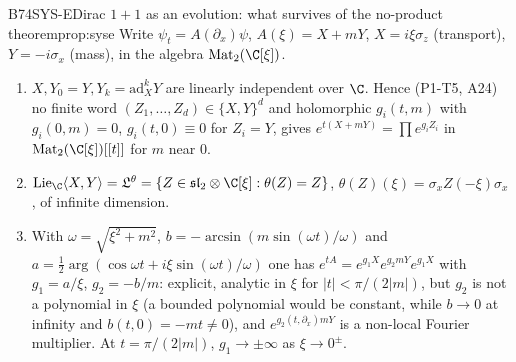 \begin{dimcard}{B74}{SYS-E}{Dirac $1+1$ as an evolution: what survives of the no-product theorem}{\proved}{prop:syse}
Write $\psi_t=A(\partial_x)\psi$, $A(\xi)=X+mY$, $X=i\xi\sigma_z$ (transport), $Y=-i\sigma_x$ (mass), in the algebra $\mathrm{Mat}_2(\C[\xi])$.
\begin{enumerate}[label=(E\arabic*)]
\item $X,Y_0=Y,Y_k=\mathrm{ad}_X^kY$ are linearly independent over $\C$. Hence (P1-T5, A24) no finite word $(Z_1,\dots,Z_d)\in\{X,Y\}^d$ and holomorphic $g_i(t,m)$ with $g_i(0,m)=0$, $g_i(t,0)\equiv0$ for $Z_i=Y$, gives $e^{t(X+mY)}=\prod e^{g_iZ_i}$ in $\mathrm{Mat}_2(\C[\xi])[[t]]$ for $m$ near $0$.
\item $\mathrm{Lie}_\C\langle X,Y\rangle=\mathfrak L^\theta=\{Z\in\mathfrak{sl}_2\otimes\C[\xi]:\theta(Z)=Z\}$, $\theta(Z)(\xi)=\sigma_xZ(-\xi)\sigma_x$, of infinite dimension.
\item With $\omega=\sqrt{\xi^2+m^2}$, $b=-\arcsin(m\sin(\omega t)/\omega)$ and $a=\frac12\arg(\cos\omega t+i\xi\sin(\omega t)/\omega)$ one has $e^{tA}=e^{g_1X}e^{g_2mY}e^{g_1X}$ with $g_1=a/\xi$, $g_2=-b/m$: explicit, analytic in $\xi$ for $|t|<\pi/(2|m|)$, but $g_2$ is not a polynomial in $\xi$ (a bounded polynomial would be constant, while $b\to0$ at infinity and $b(t,0)=-mt\ne0$), and $e^{g_2(t,\partial_x)mY}$ is a non-local Fourier multiplier. At $t=\pi/(2|m|)$, $g_1\to\pm\infty$ as $\xi\to0^\pm$.
\end{enumerate}
\end{dimcard}

